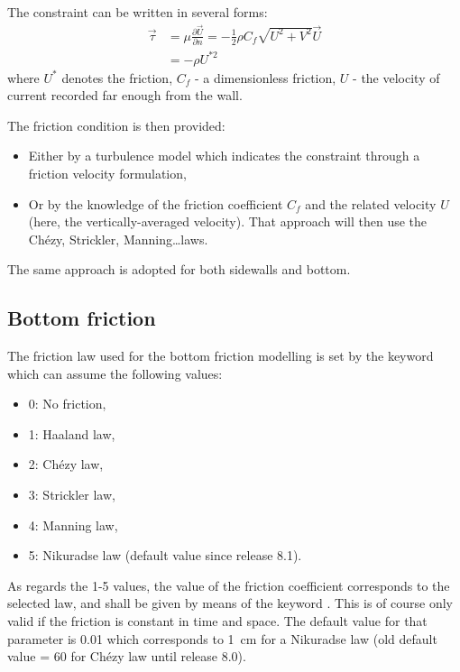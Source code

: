 The constraint can be written in several forms:
\begin{align}
\vec{\tau } & = \mu \frac{\partial \vec{U}}{\partial n}
            = -\frac{1}{2} \rho C_{f} \sqrt{U^{2} +V^{2} } \vec{U}\\
            & = -\rho U^{*2}
\end{align}
where $U^{*}$ denotes the friction, $C_{f}$ - a dimensionless friction, $U$ -
the velocity of current recorded far enough from the wall.

The friction condition is then provided:

\begin{itemize}
\item  Either by a turbulence model which indicates the constraint through a
friction velocity formulation,

\item  Or by the knowledge of the friction coefficient $C_{f}$ and the related
velocity $U$ (here, the vertically-averaged velocity). That approach will then
use the Chézy, Strickler, Manning\dots  laws.
\end{itemize}

The same approach is adopted for both sidewalls and bottom.


\subsection{Bottom friction}

The friction law used for the bottom friction modelling is set by the keyword
 which can assume the following values:

\begin{itemize}
\item  0: No friction,

\item  1: Haaland law,

\item  2: Chézy law,

\item  3: Strickler law,

\item  4: Manning law,

\item  5: Nikuradse law (default value since release 8.1).
\end{itemize}

As regards the 1-5 values, the value of the friction coefficient corresponds to
the selected law, and shall be given by means of the keyword .
This is of course only valid if the friction is constant in time and space.
The default value for that parameter is 0.01
which corresponds to 1~cm for a Nikuradse law (old default value = 60 for Chézy
law until release 8.0).

